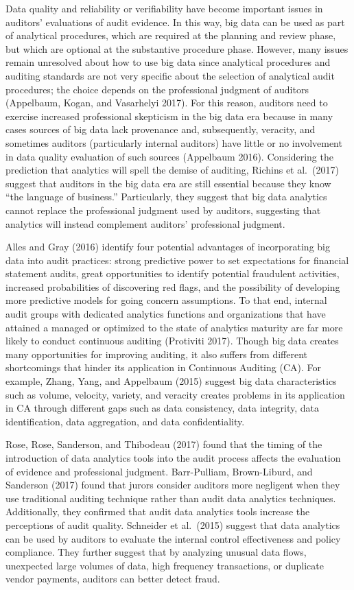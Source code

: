 \documentclass[
]{book}
\begin{document}
Data quality and reliability or verifiability have become important issues in auditors' evaluations of audit evidence. In this way, big data can be used as part of analytical procedures, which are required at the planning and review phase, but which are optional at the substantive procedure phase. However, many issues remain unresolved about how to use big data since analytical procedures and auditing standards are not very specific about the selection of analytical audit procedures; the choice depends on the professional judgment of auditors (Appelbaum, Kogan, and Vasarhelyi 2017). For this reason, auditors need to exercise increased professional skepticism in the big data era because in many cases sources of big data lack provenance and, subsequently, veracity, and sometimes auditors (particularly internal auditors) have little or no involvement in data quality evaluation of such sources (Appelbaum 2016). Considering the prediction that analytics will spell the demise of auditing, Richins et al.~(2017) suggest that auditors in the big data era are still essential because they know ``the language of business.'' Particularly, they suggest that big data analytics cannot replace the professional judgment used by auditors, suggesting that analytics will instead complement auditors' professional judgment.

Alles and Gray (2016) identify four potential advantages of incorporating big data into audit practices: strong predictive power to set expectations for financial statement audits, great opportunities to identify potential fraudulent activities, increased probabilities of discovering red flags, and the possibility of developing more predictive models for going concern assumptions. To that end, internal audit groups with dedicated analytics functions and organizations that have attained a managed or optimized to the state of analytics maturity are far more likely to conduct continuous auditing (Protiviti 2017). Though big data creates many opportunities for improving auditing, it also suffers from different shortcomings that hinder its application in Continuous Auditing (CA). For example, Zhang, Yang, and Appelbaum (2015) suggest big data characteristics such as volume, velocity, variety, and veracity creates problems in its application in CA through different gaps such as data consistency, data integrity, data identification, data aggregation, and data confidentiality.

Rose, Rose, Sanderson, and Thibodeau (2017) found that the timing of the introduction of data analytics tools into the audit process affects the evaluation of evidence and professional judgment. Barr-Pulliam, Brown-Liburd, and Sanderson (2017) found that jurors consider auditors more negligent when they use traditional auditing technique rather than audit data analytics techniques. Additionally, they confirmed that audit data analytics tools increase the perceptions of audit quality. Schneider et al.~(2015) suggest that data analytics can be used by auditors to evaluate the internal control effectiveness and policy compliance. They further suggest that by analyzing unusual data flows, unexpected large volumes of data, high frequency transactions, or duplicate vendor payments, auditors can better detect fraud.
\end{document}
